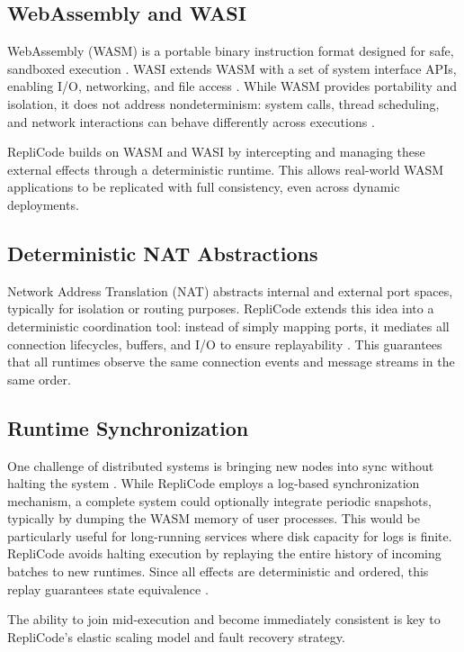 \documentclass[10pt, 
]{IEEEtran}
\begin{document}
\subsection{WebAssembly and WASI}
WebAssembly (WASM) is a portable binary instruction format designed for safe, sandboxed execution \cite{wasm2017}. WASI extends WASM with a set of system interface APIs, enabling I/O, networking, and file access \cite{wasi2023}. While WASM provides portability and isolation, it does not address nondeterminism: system calls, thread scheduling, and network interactions can behave differently across executions \cite{wasm2020}.

RepliCode builds on WASM and WASI by intercepting and managing these external effects through a deterministic runtime. This allows real-world WASM applications to be replicated with full consistency, even across dynamic deployments.

\subsection{Deterministic NAT Abstractions}
Network Address Translation (NAT) abstracts internal and external port spaces, typically for isolation or routing purposes. RepliCode extends this idea into a deterministic coordination tool: instead of simply mapping ports, it mediates all connection lifecycles, buffers, and I/O to ensure replayability \cite{deterministic2009}. This guarantees that all runtimes observe the same connection events and message streams in the same order.

\subsection{Runtime Synchronization}
One challenge of distributed systems is bringing new nodes into sync without halting the system \cite{elastic2016}. While RepliCode employs a log-based synchronization mechanism, a complete system could optionally integrate periodic snapshots, typically by dumping the WASM memory of user processes. This would be particularly useful for long-running services where disk capacity for logs is finite. RepliCode avoids halting execution by replaying the entire history of incoming batches to new runtimes. Since all effects are deterministic and ordered, this replay guarantees state equivalence \cite{consistency2015}.

The ability to join mid-execution and become immediately consistent is key to RepliCode's elastic scaling model and fault recovery strategy.
\end{document}
